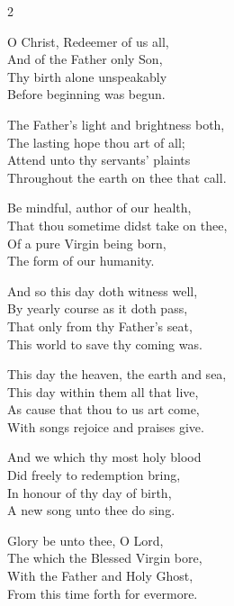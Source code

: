 \begin{multicols}{2}
\begin{enpars}
O Christ, Redeemer of us all,\\
And of the Father only Son,\\
Thy birth alone unspeakably\\
Before beginning was begun.

The Father's light and brightness both,\\
The lasting hope thou art of all;\\
Attend unto thy servants' plaints\\
Throughout the earth on thee that call.

Be mindful, author of our health,\\
That thou sometime didst take on thee,\\
Of a pure Virgin being born,\\
The form of our humanity.

And so this day doth witness well,\\
By yearly course as it doth pass,\\
That only from thy Father's seat,\\
This world to save thy coming was.

This day the heaven, the earth and sea,\\
This day within them all that live,\\
As cause that thou to us art come,\\
With songs rejoice and praises give.

And we which thy most holy blood\\
Did freely to redemption bring,\\
In honour of thy day of birth,\\
A new song unto thee do sing.

Glory be unto thee, O Lord,\\
The which the Blessed Virgin bore,\\
With the Father and Holy Ghost,\\
From this time forth for evermore.
\end{enpars}
\end{multicols}